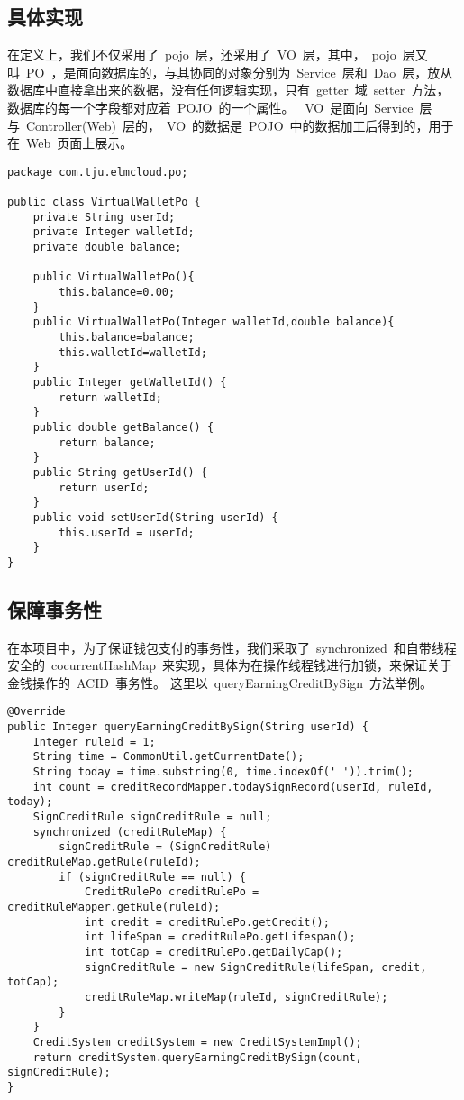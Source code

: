 \subsection{具体实现}
在定义上，我们不仅采用了~pojo~层，还采用了~VO~层，其中，~pojo~层又叫~PO~，是面向数据库的，与其协同的对象分别为~Service~层和~Dao~层，放从数据库中直接拿出来的数据，没有任何逻辑实现，只有~getter~域~setter~方法，数据库的每一个字段都对应着~POJO~的一个属性。
~VO~是面向~Service~层与~Controller(Web)~层的，~VO~的数据是~POJO~中的数据加工后得到的，用于在~Web~页面上展示。

\begin{lstlisting}[basicstyle=\footnotesize]
package com.tju.elmcloud.po;

public class VirtualWalletPo {
	private String userId;
	private Integer walletId;
	private double balance;

	public VirtualWalletPo(){
		this.balance=0.00;
	}
	public VirtualWalletPo(Integer walletId,double balance){
		this.balance=balance;
		this.walletId=walletId;
	}
	public Integer getWalletId() {
		return walletId;
	}
	public double getBalance() {
		return balance;
	}
	public String getUserId() {
		return userId;
	}
	public void setUserId(String userId) {
		this.userId = userId;
	}
}	
\end{lstlisting}
		
\subsection{保障事务性}
在本项目中，为了保证钱包支付的事务性，我们采取了~synchronized~和自带线程安全的~cocurrentHashMap~来实现，具体为在操作线程钱进行加锁，来保证关于金钱操作的~ACID~事务性。
这里以~queryEarningCreditBySign~方法举例。

\begin{lstlisting}[basicstyle=\footnotesize]
@Override
public Integer queryEarningCreditBySign(String userId) {
	Integer ruleId = 1;
	String time = CommonUtil.getCurrentDate();
	String today = time.substring(0, time.indexOf(' ')).trim();
	int count = creditRecordMapper.todaySignRecord(userId, ruleId, today);
	SignCreditRule signCreditRule = null;
	synchronized (creditRuleMap) {
		signCreditRule = (SignCreditRule) creditRuleMap.getRule(ruleId);
		if (signCreditRule == null) {
			CreditRulePo creditRulePo = creditRuleMapper.getRule(ruleId);
			int credit = creditRulePo.getCredit();
			int lifeSpan = creditRulePo.getLifespan();
			int totCap = creditRulePo.getDailyCap();
			signCreditRule = new SignCreditRule(lifeSpan, credit, totCap);
			creditRuleMap.writeMap(ruleId, signCreditRule);
		}
	}
	CreditSystem creditSystem = new CreditSystemImpl();
	return creditSystem.queryEarningCreditBySign(count, signCreditRule);
}
\end{lstlisting}

